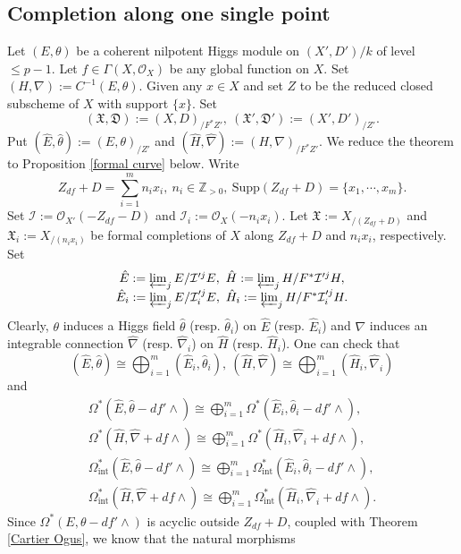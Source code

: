 \documentclass[12pt, a4paper]{article}
\begin{document}
\subsection{Completion along one single point}
Let $(E,\theta)$ be a coherent nilpotent Higgs module on $(X',D')/k$ of level $\leq p-1$. Let $f\in\Gamma(X,\mathcal O_X)$ be any global function on $X$. Set $(H,\nabla):=C^{-1}(E,\theta)$. Given any $x\in X$ and set $Z$ to be the reduced closed subscheme of $X$ with support $\{x\}$. Set
$$(\mathfrak X,\mathfrak D):=(X,D)_{/F^*Z'},~(\mathfrak X',\mathfrak D'):=(X',D')_{/Z'}.$$ Put $(\hat E,\hat \theta):=(E,\theta)_{/Z'}$ and $(\hat H,\hat\nabla):=(H,\nabla)_{/F^*Z'}$.
\iffalse
We reduce the theorem to Proposition \ref{formal curve} below. Write
$$
Z_{df}+D=\sum_{i=1}^mn_ix_i,~n_i\in\mathbb Z_{>0},~\mathrm{Supp}(Z_{df}+D)=\{x_1,\cdots,x_m\}.
$$
Set $\mathcal I:=\mathcal O_{X'}(-Z_{df}-D)$ and $\mathcal I_i:=\mathcal O_X(-n_ix_i)$. Let $\mathfrak X:=X_{/(Z_{df}+D)}$ and $\mathfrak X_i:=X_{/(n_ix_i)}$ be formal completions of $X$ along $Z_{df}+D$ and $n_ix_i$, respectively.
Set 
$$
\begin{array}{c}
\hat E:=\varprojlim_jE/\mathcal I'^jE,~\hat H:=\varprojlim_jH/F^*\mathcal I'^jH,\\
\hat E_i:=\varprojlim_jE/\mathcal I_i'^jE,~\hat H_i:=\varprojlim_jH/F^*\mathcal I_i'^jH.
\end{array}
$$
Clearly, $\theta$ induces a Higgs field $\hat\theta$ (resp. $\hat\theta_i$) on $\hat E$ (resp. $\hat E_i$) and $\nabla$ induces  an integrable connection $\hat\nabla$ (resp. $\hat\nabla_i$) on $\hat H$ (resp. $\hat H_i$).  One can check that
$$
(\hat E,\hat\theta)\cong\bigoplus_{i=1}^m(\hat E_i,\hat\theta_i),~(\hat H,\hat\nabla)\cong\bigoplus_{i=1}^m(\hat H_i,\hat\nabla_i)
$$
and
$$
\begin{array}{c}
\Omega^*(\hat E,\hat\theta-df'\wedge)\cong\bigoplus_{i=1}^m\Omega^*(\hat E_i,\hat\theta_i-df'\wedge),\\
\Omega^*(\hat H,\hat\nabla+df\wedge)\cong\bigoplus_{i=1}^m\Omega^*(\hat H_i,\hat\nabla_i+df\wedge),\\
\Omega_{\mathrm{int}}^*(\hat E,\hat\theta-df'\wedge)\cong\bigoplus_{i=1}^m\Omega_\mathrm{int}^*(\hat E_i,\hat\theta_i-df'\wedge),\\
\Omega_\mathrm{int}^*(\hat H,\hat\nabla+df\wedge)\cong\bigoplus_{i=1}^m\Omega_\mathrm{int}^*(\hat H_i,\hat\nabla_i+df\wedge).
\end{array}
$$
Since $\Omega^*( E,\theta-df'\wedge)$ is acyclic outside $Z_{df}+D$, coupled with Theorem \ref{Cartier Ogus}, we know that the natural morphisms
\end{document}
